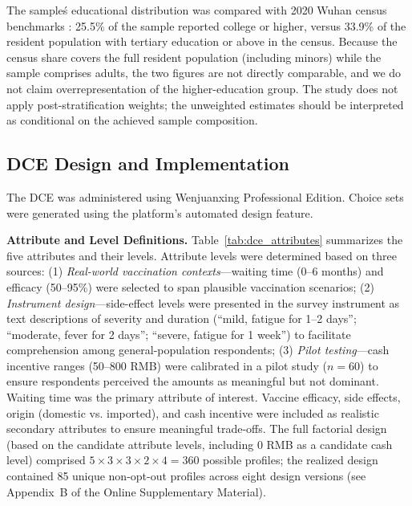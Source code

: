 \documentclass[12pt]{article}
\begin{document}
The sample\'s educational distribution was compared with 2020 Wuhan census benchmarks \parencite{WuhanCensus2021}: 25.5\% of the sample reported college or higher, versus 33.9\% of the resident population with tertiary education or above in the census. Because the census share covers the full resident population (including minors) while the sample comprises adults, the two figures are not directly comparable, and we do not claim overrepresentation of the higher-education group. The study does not apply post-stratification weights; the unweighted estimates should be interpreted as conditional on the achieved sample composition.


\subsection{DCE Design and Implementation}

The DCE was administered using Wenjuanxing Professional Edition. Choice sets were generated using the platform's automated design feature.

\textbf{Attribute and Level Definitions.} Table~\ref{tab:dce_attributes} summarizes the five attributes and their levels. Attribute levels were determined based on three sources: (1) \textit{Real-world vaccination contexts}---waiting time (0--6 months) and efficacy (50--95\%) were selected to span plausible vaccination scenarios; (2) \textit{Instrument design}---side-effect levels were presented in the survey instrument as text descriptions of severity and duration (``mild, fatigue for 1--2 days''; ``moderate, fever for 2 days''; ``severe, fatigue for 1 week'') to facilitate comprehension among general-population respondents; (3) \textit{Pilot testing}---cash incentive ranges (50--800 RMB) were calibrated in a pilot study ($n=60$) to ensure respondents perceived the amounts as meaningful but not dominant. Waiting time was the primary attribute of interest. Vaccine efficacy, side effects, origin (domestic vs. imported), and cash incentive were included as realistic secondary attributes to ensure meaningful trade-offs. The full factorial design (based on the candidate attribute levels, including 0 RMB as a candidate cash level) comprised $5 \times 3 \times 3 \times 2 \times 4 = 360$ possible profiles; the realized design contained 85 unique non-opt-out profiles across eight design versions (see Appendix~B of the Online Supplementary Material).
\end{document}
